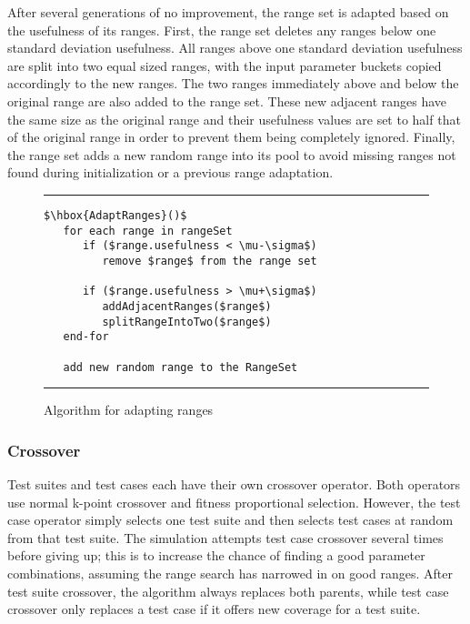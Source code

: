 \documentclass[runningheads]{llncs}
\begin{document}
After several generations of no improvement, the range set is adapted based on the usefulness of its ranges. First, the range set deletes any ranges below one standard deviation usefulness. All ranges above one standard deviation usefulness are split into two equal sized ranges, with the input parameter buckets copied accordingly to the new ranges. The two ranges immediately above and below the original range are also added to the range set. These new adjacent ranges have the same size as the original range and their usefulness values are set to half that of the original range in order to prevent them being completely ignored. Finally, the range set adds a new random range into its pool to avoid missing ranges not found during initialization or a previous range adaptation.

\begin{figure}[h!]
\begin{center}
\hrule
\medskip
\begin{Verbatim}[fontfamily=tt, xleftmargin=10pt, commandchars=\\\{\},
   codes={\catcode`$=3\catcode`^=7\catcode`_=8}]
$\hbox{AdaptRanges}()$    
   for each range in rangeSet
      if ($range.usefulness < \mu-\sigma$)
         remove $range$ from the range set
      
      if ($range.usefulness > \mu+\sigma$)
         addAdjacentRanges($range$)
         splitRangeIntoTwo($range$)  
   end-for
   
   add new random range to the RangeSet
\end{Verbatim}
\hrule
\end{center}
\caption{Algorithm for adapting ranges \label{fig:adptRang}}
\end{figure}
\FloatBarrier

\subsubsection{Crossover}

Test suites and test cases each have their own crossover operator. Both operators use normal k-point crossover and fitness proportional selection. However, the test case operator simply selects one test suite and then selects test cases at random from that test suite. The simulation attempts test case crossover several times before giving up; this is to increase the chance of finding a good parameter combinations, assuming the range search has narrowed in on good ranges. After test suite crossover, the algorithm always replaces both parents, while test case crossover only replaces a test case if it offers new coverage for a test suite.
\end{document}
